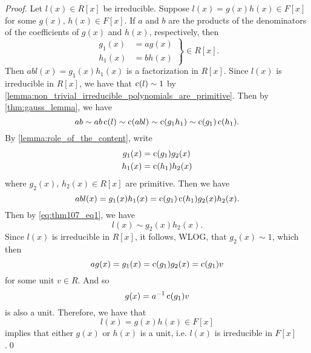 \begin{proof}
  Let $l(x) \in R[x]$ be irreducible. Suppose $l(x) = g(x) h(x) \in F[x]$ for some $g(x), \, h(x) \in F[x]$. If $a$ and $b$  are the products of the denominators of the coefficients of $g(x)$ and $h(x)$, respectively, then
  \begin{equation*}
    \left.\begin{aligned}
      g_1(x) &= ag(x) \\
      h_1(x) &= bh(x)
  \end{aligned}\right\} \in R[x].
  \end{equation*}
  Then $abl(x) = g_1(x) h_1(x)$ is a factorization in $R[x]$. Since $l(x)$ is irreducible in $R[x]$, we have that $\operatorname{c}(l) \sim 1$ by \cref{lemma:non_trivial_irreducible_polynomials_are_primitive}. Then by \cref{thm:gauss_lemma}, we have
  \begin{equation}\label{eq:thm107_eq1}
    ab \sim ab\operatorname{c}(l) \sim \operatorname{c}(abl) \sim \operatorname{c}(g_1 h_1) \sim \operatorname{c}(g_1) \operatorname{c}(h_1).
  \end{equation}
  By \cref{lemma:role_of_the_content}, write
  \begin{align*}
    g_1(x) &= \operatorname{c}(g_1) g_2(x) \\
    h_1(x) &= \operatorname{c}(h_1) h_2(x)
  \end{align*}
  where $g_2(x), \, h_2(x) \in R[x]$ are primitive. Then we have
  \begin{equation*}
    abl(x) = g_1(x) h_1(x) = \operatorname{c}(g_1) \operatorname{c}(h_1) g_2(x) h_2(x).
  \end{equation*}
  Then by \cref{eq:thm107_eq1}, we have
  \begin{equation*}
    l(x) \sim g_2(x) h_2(x).
  \end{equation*}
  Since $l(x)$ is irreducible in $R[x]$, it follows, WLOG, that $g_2(x) \sim 1$, which then
  \begin{equation*}
    ag(x) = g_1(x) = \operatorname{c}(g_1) g_2(x) = \operatorname{c}(g_1) v
  \end{equation*}
  for some unit $v \in R$. And so
  \begin{equation*}
    g(x) = a^{-1} \operatorname{c}(g_1) v
  \end{equation*}
  is also a unit. Therefore, we have that
  \begin{equation*}
    l(x) = g(x) h(x) \in F[x]
  \end{equation*}
  implies that either $g(x)$ or $h(x)$ is a unit, i.e. $l(x)$ is irreducible in $F[x]$.\qed
\end{proof}



